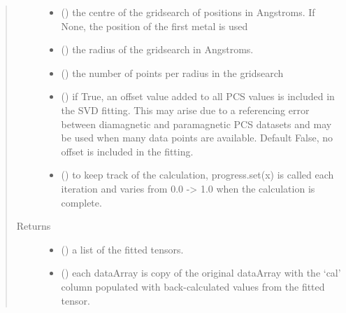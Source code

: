 \documentclass[a4paper,10pt,english,openany,oneside]{sphinxmanual}
\begin{document}
\begin{fulllineitems}
\begin{quote}
\begin{description}
\begin{itemize}
\item {} 
 (\sphinxstyleliteralemphasis{\sphinxupquote{, }}) \textendash{} the centre of the gridsearch of positions in Angstroms.
If None, the position of the first metal is used

\item {} 
 (\sphinxstyleliteralemphasis{\sphinxupquote{, }}) \textendash{} the radius of the gridsearch in Angstroms.

\item {} 
 (\sphinxstyleliteralemphasis{\sphinxupquote{, }}) \textendash{} the number of points per radius in the gridsearch

\item {} 
 (\sphinxstyleliteralemphasis{\sphinxupquote{, }}) \textendash{} if True, an offset value added to all PCS values is included in
the SVD fitting. This may arise due to a referencing error between
diamagnetic and paramagnetic PCS datasets and may be used when
many data points are available.
Default False, no offset is included in the fitting.

\item {} 
 (\sphinxstyleliteralemphasis{\sphinxupquote{, }}) \textendash{} to keep track of the calculation, progress.set(x) is called each
iteration and varies from 0.0 -\textgreater{} 1.0 when the calculation is complete.

\end{itemize}

\item[{Returns}] \leavevmode
\begin{itemize}
\item {} 
 () \textendash{} a list of the fitted tensors.

\item {} 
 () \textendash{} each dataArray is copy of the original dataArray with
the ‘cal’ column populated with back-calculated values from the
fitted tensor.

\end{itemize}


\end{description}\end{quote}

\end{fulllineitems}
\end{document}
